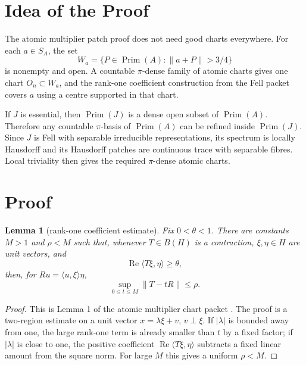 \documentclass[11pt]{article}
\newtheorem{lemma}{Lemma}
\newcommand{\Prim}{\operatorname{Prim}}
\begin{document}
\section*{Idea of the Proof}

The atomic multiplier patch proof does not need good charts everywhere.  For
each \(a\in S_A\), the set
\[
        W_a=\{P\in\Prim(A):\|a+P\|>3/4\}
\]
is nonempty and open.  A countable \(\pi\)-dense family of atomic charts gives
one chart \(O_n\subset W_a\), and the rank-one coefficient construction from
the Fell packet covers \(a\) using a centre supported in that chart.

If \(J\) is essential, then \(\Prim(J)\) is a dense open subset of
\(\Prim(A)\).  Therefore any countable \(\pi\)-basis of \(\Prim(A)\) can be
refined inside \(\Prim(J)\).  Since \(J\) is Fell with separable irreducible
representations, its spectrum is locally Hausdorff and its Hausdorff patches
are continuous trace with separable fibres.  Local triviality then gives the
required \(\pi\)-dense atomic charts.

\section*{Proof}

\begin{lemma}[rank-one coefficient estimate]
\label{lem:rankone}
Fix \(0<\theta<1\).  There are constants \(M>1\) and \(\rho<M\) such that,
whenever \(T\in B(H)\) is a contraction, \(\xi,\eta\in H\) are unit vectors,
and
\[
        \operatorname{Re}\langle T\xi,\eta\rangle\ge\theta,
\]
then, for \(R u=\langle u,\xi\rangle\eta\),
\[
        \sup_{0\le t\le M}\|T-tR\|\le\rho .
\]
\end{lemma}

\begin{proof}
This is Lemma 1 of the atomic multiplier chart packet
\cite{lane19atomic}.  The proof is a two-region estimate on a unit vector
\(x=\lambda\xi+v\), \(v\perp\xi\).  If \(|\lambda|\) is bounded away from
one, the large rank-one term is already smaller than \(t\) by a fixed factor;
if \(|\lambda|\) is close to one, the positive coefficient
\(\operatorname{Re}\langle T\xi,\eta\rangle\) subtracts a fixed linear amount
from the square norm.  For large \(M\) this gives a uniform
\(\rho<M\).
\end{proof}
\end{document}
